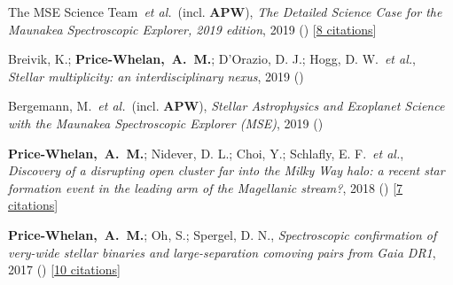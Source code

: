 \item[{\color{deemph}\scriptsize5}]The MSE Science Team~\textit{et al.}~(incl. \textbf{APW}), \textit{The Detailed Science Case for the Maunakea Spectroscopic Explorer, 2019 edition}, 2019 () [\href{http://adsabs.harvard.edu/abs/2019arXiv190404907T}{8 citations}]

\item[{\color{deemph}\scriptsize4}]Breivik, K.; \textbf{Price-Whelan,~A.~M.}; D'Orazio, D. J.; Hogg, D. W.~\textit{et al.}, \textit{Stellar multiplicity: an interdisciplinary nexus}, 2019 ()

\item[{\color{deemph}\scriptsize3}]Bergemann, M.~\textit{et al.}~(incl. \textbf{APW}), \textit{Stellar Astrophysics and Exoplanet Science with the Maunakea Spectroscopic Explorer (MSE)}, 2019 ()

\item[{\color{deemph}\scriptsize2}]\textbf{Price-Whelan,~A.~M.}; Nidever, D. L.; Choi, Y.; Schlafly, E. F.~\textit{et al.}, \textit{Discovery of a disrupting open cluster far into the Milky Way halo: a recent star formation event in the leading arm of the Magellanic stream?}, 2018 () [\href{http://adsabs.harvard.edu/abs/2018arXiv181105991P}{7 citations}]

\item[{\color{deemph}\scriptsize1}]\textbf{Price-Whelan,~A.~M.}; Oh, S.; Spergel, D. N., \textit{Spectroscopic confirmation of very-wide stellar binaries and large-separation comoving pairs from Gaia DR1}, 2017 () [\href{http://adsabs.harvard.edu/abs/2017arXiv170903532P}{10 citations}]